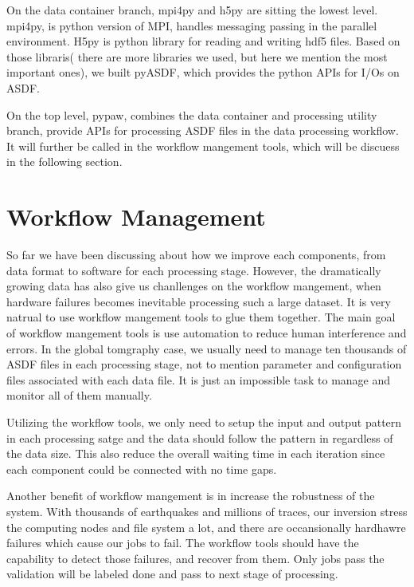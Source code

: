 On the data container branch, mpi4py and h5py are sitting the lowest level. mpi4py,
is python version of MPI, handles messaging passing in the parallel environment.
H5py is python library for reading and writing hdf5 files. Based on those libraris(
there are more libraries we used, but here we mention the most important ones), we built
pyASDF, which provides the python APIs for I/Os on ASDF.

On the top level, pypaw, combines the data container and processing utility branch,
 provide APIs for processing ASDF files in the data processing workflow. It will
 further be called in the workflow mangement tools, which will
 be discuess in the following section.

\section{Workflow Management}
\label{section:workflow_management}

So far we have been discussing about how we improve each components, from data format
to software for each processing stage. 
However, the dramatically growing data has also give us chanllenges on the workflow mangement,
when hardware failures becomes inevitable processing such a large dataset.
It is very natrual to use workflow mangement tools to glue them together.
The main goal of workflow mangement tools is use automation to
reduce human interference and errors. In the global tomgraphy case,
we usually need to manage ten thousands of ASDF files in each processing stage,
not to mention parameter and configuration files associated with
each data file. It is just an impossible task to manage and monitor
all of them manually.

Utilizing the workflow tools, we only need to setup the input and output
pattern in each processing satge and the data should
follow the pattern in regardless of the data size.
This also reduce the overall waiting time in each iteration since
each component could be connected with no time gaps. 

Another benefit of workflow mangement is in increase the robustness of the system.
With thousands of earthquakes and millions of traces, our inversion stress the
computing nodes and file system a lot, and there are occansionally hardhawre failures
which cause our jobs to fail. The workflow tools should have the capability to
detect those failures, and recover from them. Only jobs pass the validation will
be labeled done and pass to next stage of processing.

